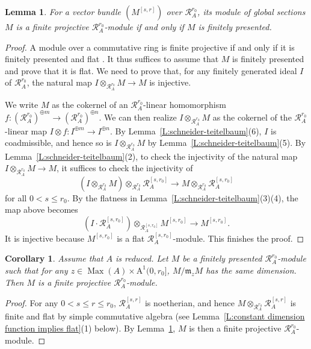 \documentclass[12pt]{article}
\newtheorem{lemma}[theorem]{Lemma}
\newtheorem{cor}[theorem]{Corollary}
\theoremstyle{definition}
\numberwithin{equation}{theorem}
\newcommand{\calR}{\mathcal{R}}
\newcommand{\gothm}{\mathfrak{m}}
\newcommand{\rmA}{\mathrm{A}}
\DeclareMathOperator{\Max}{Max}
\begin{document}
\begin{lemma}
\label{L:fp+bundle=>finite-proj}
For a vector bundle $(M^{[s,r]})$ over $\calR_A^{r_0}$, its module of global sections $M$ is a finite projective $\calR_A^{r_0}$-module if and only if $M$ is finitely presented.
\end{lemma}
\begin{proof}
A module over a commutative ring is finite projective if and only if it is finitely presented and flat \cite[Corollary~of~Theorem~7.12]{matsumura}.  It thus suffices to assume that $M$ is finitely presented and prove that it is flat.  We need to prove that, for any finitely generated ideal $I$ of $\calR_A^{r_0}$, the natural map $I \otimes_{\calR_A^{r_0}} M \to M$ is injective.

We write $M$ as the cokernel of an $\calR_A^{r_0}$-linear homomorphism $f: (\calR_A^{r_0})^{\oplus m} \to (\calR_A^{r_0})^{\oplus n}$.  We can then realize $I \otimes_{\calR_A^{r_0}} M$ as  the cokernel of the $\calR_A^{r_0}$-linear map $I \otimes f: I^{\oplus m} \to I^{\oplus n}$.  By Lemma~\ref{L:schneider-teitelbaum}(6), $I$ is coadmissible, and hence so is $I \otimes_{\calR_A^{r_0}} M$ by Lemma~\ref{L:schneider-teitelbaum}(5).   By Lemma~\ref{L:schneider-teitelbaum}(2), to check the injectivity of the natural map $I \otimes_{\calR_A^{r_0}} M \to M$, it suffices to check the injectivity of
\[
(I \otimes_{\calR_A^{r_0}} M) \otimes_{\calR_A^{r_0}} \calR_A^{[s,r_0]} \to M\otimes_{\calR_A^{r_0}} \calR_A^{[s,r_0]}
\]
for all $0<s \leq r_0$.
By the flatness in Lemma~\ref{L:schneider-teitelbaum}(3)(4), the map above becomes
\[
(I\cdot \calR_A^{[s,r_0]}) \otimes_{\calR_A^{[s,r_0]}} M^{[s,r_0]} \to M^{[s,r_0]}.
\]
It is injective because $M^{[s,r_0]}$ is a flat $\calR_A^{[s,r_0]}$-module.  This finishes the proof.
\end{proof}


\begin{cor}
\label{C:pointwise criterion for finite projectivity}
Assume that $A$ is reduced.
Let $M$ be a finitely presented $\calR_A^{r_0}$-module such that for any $z \in \Max(A) \times \rmA^1(0, r_0]$, $M/\gothm_zM$ has the same dimension.  Then $M$ is a finite projective $\calR_A^{r_0}$-module.
\end{cor}
\begin{proof}
For any $0<s\leq r\leq r_0$, $\calR_A^{[s,r]}$ is noetherian, and hence $M \otimes_{\calR_A^{r_0}}\calR_A^{[s,r]}$ is finite and flat by simple commutative algebra (see Lemma~\ref{L:constant dimension function implies flat}(1) below).  By Lemma~\ref{L:fp+bundle=>finite-proj}, $M$ is then a finite projective $\calR_A^{r_0}$-module.
\end{proof}
\end{document}
